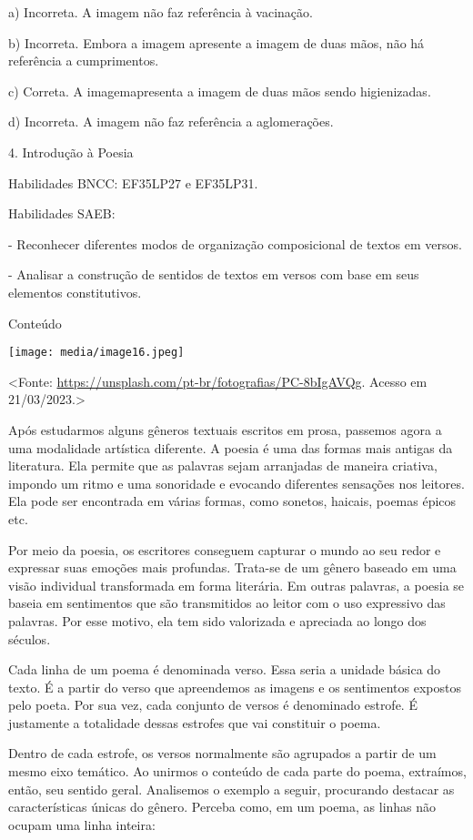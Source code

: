 a) Incorreta. A imagem não faz referência à vacinação.

b) Incorreta. Embora a imagem apresente a imagem de duas mãos, não há
referência a cumprimentos.

c) Correta. A imagemapresenta a imagem de duas mãos sendo higienizadas.

d) Incorreta. A imagem não faz referência a aglomerações.

4. Introdução à Poesia

Habilidades BNCC: EF35LP27 e EF35LP31.

Habilidades SAEB:

- Reconhecer diferentes modos de organização composicional de textos em
versos.

- Analisar a construção de sentidos de textos em versos com base em seus
elementos constitutivos.

Conteúdo

\texttt{[image: media/image16.jpeg]}

\textless{}Fonte:
\url{https://unsplash.com/pt-br/fotografias/PC-8bIgAVQg}. Acesso em
21/03/2023.\textgreater{}

Após estudarmos alguns gêneros textuais escritos em prosa, passemos
agora a uma modalidade artística diferente. A poesia é uma das formas
mais antigas da literatura. Ela permite que as palavras sejam arranjadas
de maneira criativa, impondo um ritmo e uma sonoridade e evocando
diferentes sensações nos leitores. Ela pode ser encontrada em várias
formas, como sonetos, haicais, poemas épicos etc.

Por meio da poesia, os escritores conseguem capturar o mundo ao seu
redor e expressar suas emoções mais profundas. Trata-se de um gênero
baseado em uma visão individual transformada em forma literária. Em
outras palavras, a poesia se baseia em sentimentos que são transmitidos
ao leitor com o uso expressivo das palavras. Por esse motivo, ela tem
sido valorizada e apreciada ao longo dos séculos.

Cada linha de um poema é denominada verso. Essa seria a unidade básica
do texto. É a partir do verso que apreendemos as imagens e os
sentimentos expostos pelo poeta. Por sua vez, cada conjunto de versos é
denominado estrofe. É justamente a totalidade dessas estrofes que vai
constituir o poema.

Dentro de cada estrofe, os versos normalmente são agrupados a partir de
um mesmo eixo temático. Ao unirmos o conteúdo de cada parte do poema,
extraímos, então, seu sentido geral. Analisemos o exemplo a seguir,
procurando destacar as características únicas do gênero. Perceba como,
em um poema, as linhas não ocupam uma linha inteira:

